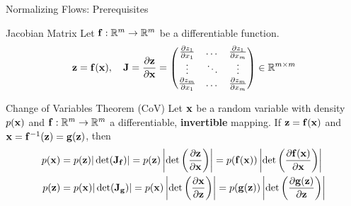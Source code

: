 \documentclass{beamer}
\begin{document}
\begin{frame}{Normalizing Flows: Prerequisites}
	\begin{block}{Jacobian Matrix}
		Let $\mathbf{f}: \mathbb{R}^m \rightarrow \mathbb{R}^m$ be a differentiable function.
		\[
			\mathbf{z} = \mathbf{f}(\mathbf{x}), \quad 
			\mathbf{J} =  \frac{\partial \mathbf{z}}{\partial \mathbf{x}} =
			\begin{pmatrix}
				\frac{\partial z_1}{\partial x_1} & \dots & \frac{\partial z_1}{\partial x_m} \\
				\vdots & \ddots & \vdots \\ 
				\frac{\partial z_m}{\partial x_1} & \dots & \frac{\partial z_m}{\partial x_m}
			\end{pmatrix} \in \mathbb{R}^{m \times m}
		\]
		\vspace{-0.3cm}
	\end{block}
	\begin{block}{Change of Variables Theorem (CoV)}
		Let $\mathbf{x}$ be a random variable with density $p(\mathbf{x})$ and $\mathbf{f}: \mathbb{R}^m \rightarrow \mathbb{R}^m$ a differentiable, \textbf{invertible} mapping. If $\mathbf{z} = \mathbf{f}(\mathbf{x})$ and $\mathbf{x} = \mathbf{f}^{-1}(\mathbf{z}) = \mathbf{g}(\mathbf{z})$, then
		\begin{align*}
			p(\mathbf{x}) &= p(\mathbf{z}) |\det(\mathbf{J}_{\mathbf{f}})| = p(\mathbf{z}) \left|\det \left( \frac{\partial \mathbf{z}}{\partial \mathbf{x}} \right) \right| = p(\mathbf{f}(\mathbf{x})) \left|\det \left(  \frac{\partial \mathbf{f}(\mathbf{x})}{\partial \mathbf{x}} \right) \right| \\
			p(\mathbf{z}) &= p(\mathbf{x}) |\det(\mathbf{J}_{\mathbf{g}})| = p(\mathbf{x}) \left|\det \left(  \frac{\partial \mathbf{x}}{\partial \mathbf{z}} \right) \right| = p(\mathbf{g}(\mathbf{z})) \left|\det \left(  \frac{\partial \mathbf{g}(\mathbf{z})}{\partial \mathbf{z}} \right) \right|
		\end{align*}
		\vspace{-0.5cm}
	\end{block}
\end{frame}
\end{document}
